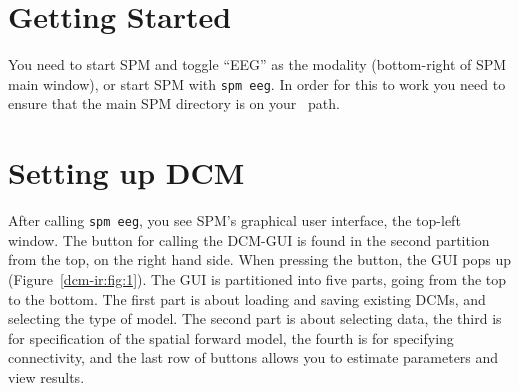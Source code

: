\section{Getting Started}

You need to start SPM and toggle ``EEG'' as the modality (bottom-right of SPM main window), or start SPM with \texttt{spm eeg}. In order for this to work you need to ensure that the main SPM directory is on your \matlab\ path.

\section{Setting up DCM}

After calling \texttt{spm eeg}, you see SPM's graphical user interface, the top-left window. The button for calling the DCM-GUI is found in the second partition from the top, on the right hand side. When pressing the button, the GUI pops up (Figure~\ref{dcm-ir:fig:1}). The GUI is partitioned into five parts, going from the top to the bottom. The first part is about loading and saving existing DCMs, and selecting the type of model. The second part is about selecting data, the third is for specification of the spatial forward model, the fourth is for specifying connectivity, and the last row of buttons allows you to estimate parameters and view results.

